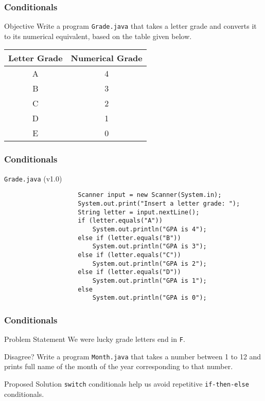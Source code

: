 \documentclass[10pt, compress]{beamer}
\begin{document}
\begin{frame}[fragile]
	\frametitle{Conditionals}
	\begin{block}{Objective}
		Write a program \texttt{Grade.java} that takes a letter grade and converts it to its numerical equivalent, based on the table given below.
		\begin{table}[H]
			\begin{tabular}{c|c}
				Letter Grade & Numerical Grade\\
				\hline
				A & 4\\
				B & 3\\
				C & 2\\
				D & 1\\
				E & 0\\
			\end{tabular}
		\end{table}
	\end{block}
\end{frame}

\begin{frame}[fragile]
	\frametitle{Conditionals}
	\begin{block}{\texttt{Grade.java} (v1.0)}
		\begin{verbatim}
			        Scanner input = new Scanner(System.in);
			        System.out.print("Insert a letter grade: ");
			        String letter = input.nextLine();
			        if (letter.equals("A"))
			            System.out.println("GPA is 4");
			        else if (letter.equals("B"))
			            System.out.println("GPA is 3");
			        else if (letter.equals("C"))
			            System.out.println("GPA is 2");
			        else if (letter.equals("D"))
			            System.out.println("GPA is 1");
			        else
			            System.out.println("GPA is 0");
		\end{verbatim}
	\end{block}
\end{frame}

\begin{frame}[fragile]
	\frametitle{Conditionals}
	\begin{block}{Problem Statement}
		We were lucky grade letters end in \texttt{F}.
	\end{block}
	\begin{block}{Disagree?}
		Write a program \texttt{Month.java} that takes a number between 1 to 12 and prints full name of the month of the year corresponding to that number.
	\end{block}
	\begin{block}{Proposed Solution}
		\texttt{switch} conditionals help us avoid repetitive \texttt{if-then-else} conditionals.
	\end{block}
\end{frame}
\end{document}
